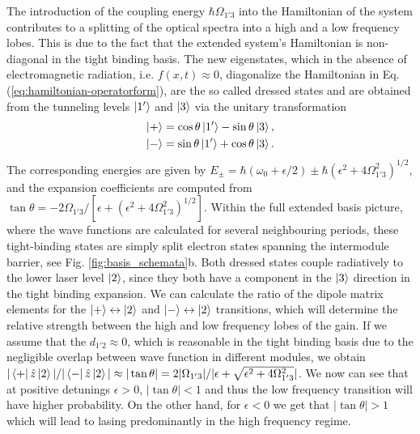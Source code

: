 \documentclass[]{spie}  %
\begin{document}
 The introduction of the coupling energy $\hbar \Omega_{1'3}$ into the Hamiltonian of the system contributes to a splitting of the optical spectra into a high and a low frequency lobes. This is due to the fact that the extended system's Hamiltonian is non-diagonal in the tight binding basis. The new eigenstates, which in the absence of electromagnetic radiation, i.e. $f(x,t) \approx 0$, diagonalize the Hamiltonian in Eq. (\ref{eq:hamiltonian-operatorform}), are the so called dressed states and are obtained from the tunneling levels $\Ket{1'}$ and $\Ket{3}$ via the unitary transformation
 \begin{align}
 \label{eq:dressedstates}
 \Ket{+} &= \cos\theta \Ket{1'} - \sin\theta \Ket{3}, \nonumber \\
 \Ket{-} &= \sin\theta \Ket{1'} + \cos\theta \Ket{3}.
 \end{align}
 The corresponding energies are given by $E_\pm =\hbar(\omega_0 +\epsilon/2) \pm \hbar \left(\epsilon^2+4\Omega_{1'3}^2\right )^{1/2}$, and the expansion coefficients are computed from   
 $
 \tan \theta = -2\Omega_{1'3}/[\epsilon+(\epsilon^2+4\Omega_{1'3}^2)^{1/2}].
 $
 Within the full extended basis picture, where the wave functions are calculated for several neighbouring periods, these tight-binding states are simply split electron states spanning the intermodule barrier, see Fig. \ref{fig:basis_schemata}b. Both dressed states  couple radiatively to the lower laser level $\ket{2}$, since they both have a component in the $\ket{3}$ direction in the tight binding expansion. We can calculate the ratio of the dipole matrix elements for the $\Ket{+}\leftrightarrow\Ket{2}$ and $\Ket{-}\leftrightarrow\Ket{2}$ transitions, which will determine the relative strength between the high and low frequency lobes of the gain. If we assume that the $d_{1'2} \approx 0$, which is reasonable in the tight binding basis due to the negligible overlap between wave function in different modules, we obtain  $|\Bra{+}\hat{z}\Ket{2}|/|\Bra{-}\hat{z}\Ket{2} | \approx |\tan\theta| =  2|\Omega_{1'3}|/|\epsilon+\sqrt{\epsilon^2+4\Omega_{1'3}^2}|$. We now can see that at positive detunings $\epsilon >0$, $|\tan\theta|<1$ and thus the low frequency transition will have higher probability. On the other hand, for $\epsilon < 0 $ we get that $|\tan\theta| >1$ which will lead to lasing predominantly in the high frequency regime.
  
\end{document}
